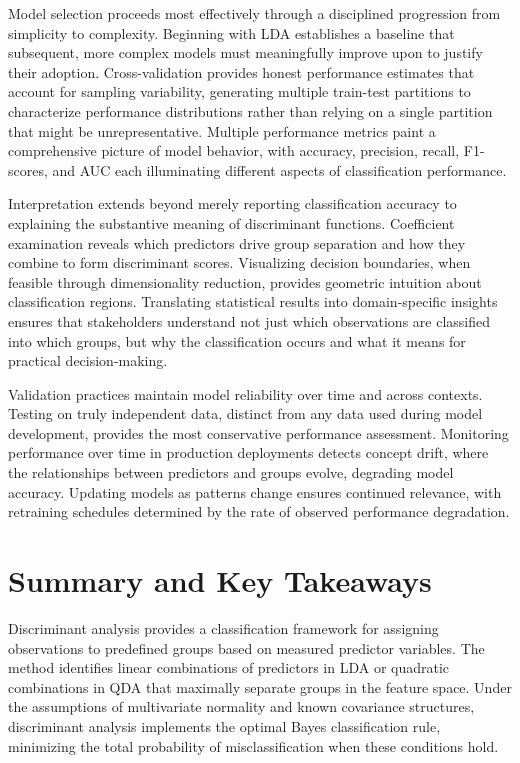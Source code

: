 \documentclass[
]{article}
\begin{document}
Model selection proceeds most effectively through a disciplined
progression from simplicity to complexity. Beginning with LDA
establishes a baseline that subsequent, more complex models must
meaningfully improve upon to justify their adoption. Cross-validation
provides honest performance estimates that account for sampling
variability, generating multiple train-test partitions to characterize
performance distributions rather than relying on a single partition that
might be unrepresentative. Multiple performance metrics paint a
comprehensive picture of model behavior, with accuracy, precision,
recall, F1-scores, and AUC each illuminating different aspects of
classification performance.

Interpretation extends beyond merely reporting classification accuracy
to explaining the substantive meaning of discriminant functions.
Coefficient examination reveals which predictors drive group separation
and how they combine to form discriminant scores. Visualizing decision
boundaries, when feasible through dimensionality reduction, provides
geometric intuition about classification regions. Translating
statistical results into domain-specific insights ensures that
stakeholders understand not just which observations are classified into
which groups, but why the classification occurs and what it means for
practical decision-making.

Validation practices maintain model reliability over time and across
contexts. Testing on truly independent data, distinct from any data used
during model development, provides the most conservative performance
assessment. Monitoring performance over time in production deployments
detects concept drift, where the relationships between predictors and
groups evolve, degrading model accuracy. Updating models as patterns
change ensures continued relevance, with retraining schedules determined
by the rate of observed performance degradation.

\section{Summary and Key Takeaways}

Discriminant analysis provides a classification framework for assigning
observations to predefined groups based on measured predictor variables.
The method identifies linear combinations of predictors in LDA or
quadratic combinations in QDA that maximally separate groups in the
feature space. Under the assumptions of multivariate normality and known
covariance structures, discriminant analysis implements the optimal
Bayes classification rule, minimizing the total probability of
misclassification when these conditions hold.
\end{document}
